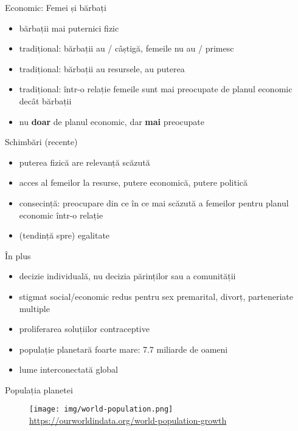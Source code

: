 \documentclass{simple}
\begin{document}
\begin{frame}{Economic: Femei și bărbați}
  \begin{itemize}
    \pause
    \item bărbații mai puternici fizic
    \pause
    \item tradițional: bărbații au / câștigă, femeile nu au / primesc
    \pause
    \item tradițional: bărbații au resursele, au puterea
    \pause
    \item tradițional: într-o relație femeile sunt mai preocupate de planul economic decât bărbații
    \pause
    \item nu \textbf{doar} de planul economic, dar \textbf{mai} preocupate
  \end{itemize}
\end{frame}

\begin{frame}{Schimbări (recente)}
  \begin{itemize}
    \pause
    \item puterea fizică are relevanță scăzută
    \pause
    \item acces al femeilor la resurse, putere economică, putere politică
    \pause
    \item consecință: preocupare din ce în ce mai scăzută a femeilor pentru planul economic într-o relație
    \pause
    \item (tendință spre) egalitate
  \end{itemize}
\end{frame}

\begin{frame}{În plus}
  \begin{itemize}
    \pause
    \item decizie individuală, nu decizia părinților sau a comunității
    \pause
    \item stigmat social/economic redus pentru sex premarital, divorț, parteneriate multiple
    \pause
    \item proliferarea soluțiilor contraceptive
    \pause
    \item populație planetară foarte mare: 7.7 miliarde de oameni
    \pause
    \item lume interconectată global
  \end{itemize}
\end{frame}

\begin{frame}{Populația planetei}
  \begin{figure}[!htbp]
    \centering
    \texttt{[image: img/world-population.png]} \\
    \tiny{\url{https://ourworldindata.org/world-population-growth}}
  \end{figure}
\end{frame}
\end{document}
